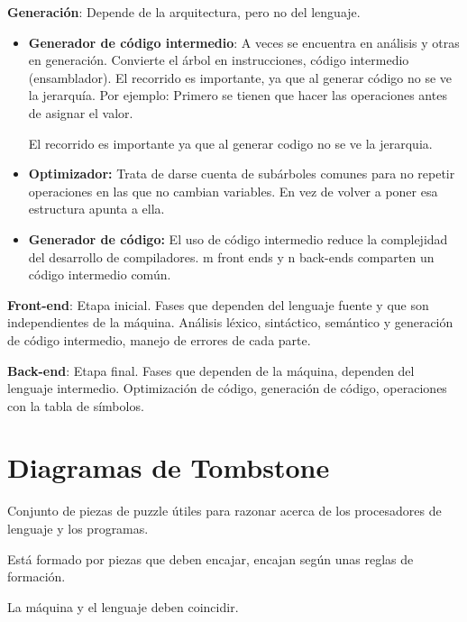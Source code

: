 \documentclass[12pt, twoside, openright]{report} %
\begin{document}
\textbf{Generación}: Depende de la arquitectura, pero no del lenguaje.
\begin{itemize}
	\item \textbf{Generador de código intermedio}: A veces se encuentra en análisis y otras
	      en generación. Convierte el árbol en instrucciones, código
	      intermedio (ensamblador). El recorrido es importante, ya que al generar
	      código no se ve la jerarquía. Por ejemplo: Primero se tienen que hacer
	      las operaciones antes de asignar el valor.

	      El recorrido es importante ya que al generar codigo no se ve la jerarquia.
	\item \textbf{Optimizador:} Trata de darse cuenta de subárboles comunes para
	      no repetir operaciones en las que no cambian variables. En vez de volver
	      a poner esa estructura apunta a ella.
	\item \textbf{Generador de código:} El uso de código intermedio reduce la
	      complejidad del desarrollo de compiladores. m front ends y n back-ends
	      comparten un código intermedio común.

\end{itemize}

\textbf{Front-end}: Etapa inicial. Fases que dependen del lenguaje
fuente y que son independientes de la máquina. Análisis léxico,
sintáctico, semántico y generación de código intermedio, manejo de
errores de cada parte.

\textbf{Back-end}: Etapa final. Fases que dependen de la máquina,
dependen del lenguaje intermedio. Optimización de código, generación de
código, operaciones con la tabla de símbolos.

\pagebreak
\section{Diagramas de Tombstone}

Conjunto de piezas de puzzle útiles para razonar acerca de los
procesadores de lenguaje y los programas.

Está formado por piezas que deben encajar, encajan según unas reglas de
formación.

La máquina y el lenguaje deben coincidir.

\begin{figure}[H]
	{\def\svgwidth{.8\textwidth}
		}
\end{figure}
\end{document}
